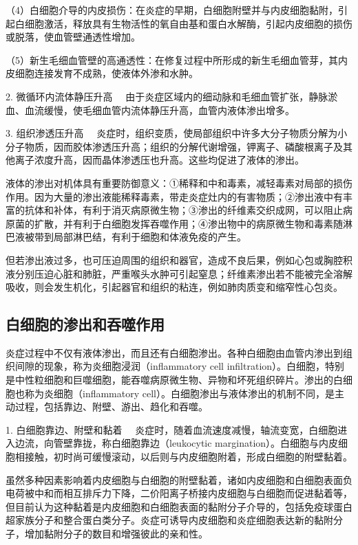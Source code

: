 （4）白细胞介导的内皮损伤：在炎症的早期，白细胞附壁并与内皮细胞黏附，引起白细胞激活，释放具有生物活性的氧自由基和蛋白水解酶，引起内皮细胞的损伤或脱落，使血管壁通透性增加。

（5）新生毛细血管壁的高通透性：在修复过程中所形成的新生毛细血管芽，其内皮细胞连接发育不成熟，使液体外渗和水肿。

{2. 微循环内流体静压升高}
　由于炎症区域内的细动脉和毛细血管扩张，静脉淤血、血流缓慢，使毛细血管内流体静压升高，血管内液体渗出增多。

{3. 组织渗透压升高}
　炎症时，组织变质，使局部组织中许多大分子物质分解为小分子物质，因而胶体渗透压升高；组织的分解代谢增强，钾离子、磷酸根离子及其他离子浓度升高，因而晶体渗透压也升高。这些均促进了液体的渗出。

液体的渗出对机体具有重要防御意义：①稀释和中和毒素，减轻毒素对局部的损伤作用。因为大量的渗出液能稀释毒素，带走炎症灶内的有害物质；②渗出液中有丰富的抗体和补体，有利于消灭病原微生物；③渗出的纤维素交织成网，可以阻止病原菌的扩散，并有利于白细胞发挥吞噬作用；④渗出物中的病原微生物和毒素随淋巴液被带到局部淋巴结，有利于细胞和体液免疫的产生。

但若渗出液过多，也可压迫周围的组织和器官，造成不良后果，例如心包或胸腔积液分别压迫心脏和肺脏，严重喉头水肿可引起窒息；纤维素渗出若不能被完全溶解吸收，则会发生机化，引起器官和组织的粘连，例如肺肉质变和缩窄性心包炎。

\subsection{白细胞的渗出和吞噬作用}

炎症过程中不仅有液体渗出，而且还有白细胞渗出。各种白细胞由血管内渗出到组织间隙的现象，称为炎细胞浸润（inflammatory
cell
infiltration）。白细胞，特别是中性粒细胞和巨噬细胞，能吞噬病原微生物、异物和坏死组织碎片。渗出的白细胞也称为炎细胞（inflammatory
cell）。白细胞渗出与液体渗出的机制不同，是主动过程，包括靠边、附壁、游出、趋化和吞噬。

{1. 白细胞靠边、附壁和黏着}
　炎症时，随着血流速度减慢，轴流变宽，白细胞进入边流，向管壁靠拢，称白细胞靠边（leukocytic
margination）。白细胞与内皮细胞相接触，初时尚可缓慢滚动，以后则与内皮细胞附着，形成白细胞的附壁黏着。

虽然多种因素影响着内皮细胞与白细胞的附壁黏着，诸如内皮细胞和白细胞表面负电荷被中和而相互排斥力下降，二价阳离子桥接内皮细胞与白细胞而促进黏着等，但目前认为这种黏着是内皮细胞和白细胞表面的黏附分子介导的，包括免疫球蛋白超家族分子和整合蛋白类分子。炎症可诱导内皮细胞和炎症细胞表达新的黏附分子，增加黏附分子的数目和增强彼此的亲和性。

